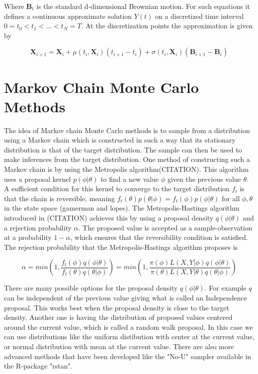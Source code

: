 Where  $\textbf{B}_t$ is the standard d-dimensional Brownian motion. For such equations it defines a continuous approximate solution $Y(t)$ on a discretized time interval $0=t_0 < t_1 < \dots < t_N = T$. At the discretization points the approximation is given by

\begin{equation}
    \textbf{X}_{i+1} = \textbf{X}_i + \mu(t_i, \textbf{X}_i)(t_{i+1} - t_i) + \sigma(t_i, \textbf{X}_i)(\textbf{B}_{i+1} - \textbf{B}_i)
    \label{eq: euler approximation}
\end{equation}






\section{Markov Chain Monte Carlo Methods}
The idea of Markov chain Monte Carlo methods is to sample from a distribution using a Markov chain which is constructed in such a way that its stationary distribution is that of the target distribution. The sample can then be used to make inferences from the target distribution. One method of constructing such a Markov chain is by using the Metropolis algorithm(CITATION). This algorithm uses a proposal kernel $p(\phi | \theta)$ to find a new value $\phi$ given the previous value $\theta$. A sufficient condition for this kernel to converge to the target distribution $f_t$ is that the chain is reversible, meaning $f_t(\theta) p(\theta|\phi) = f_t(\phi) p(\phi|\theta)$ for all $\phi,\theta$ in the state space (gamerman and lopes). The Metropolis-Hastings algorithm introduced in (CITATION) achieves this by using a proposal density $q(\phi|\theta)$ and a rejection probability $\alpha$. The proposed value is accepted as a sample-observation at a probability $1-\alpha$, which ensures that the reversibility condition is satisfied. The rejection probability that the Metropolis-Hastings algorithm proposes is

$$
    \alpha = min \left( 1, \frac{f_t(\phi)q(\phi|\theta)}{f_t(\theta)q(\theta|\phi)} \right) = min \left( 1, \frac{\pi(\phi)L(X,Y|\phi)q(\phi|\theta)}{\pi(\theta)L(X,Y|\theta)q(\theta|\phi)} \right)
$$

There are many possible options for the proposal density $q(\phi|\theta)$. For example $q$ can be independent of the previous value giving what is called an Independence proposal. This works best when the proposal density is close to the target density. Another one is having the distribution of proposed values centered around the current value, which is called a random walk proposal. In this case we can use distributions like the uniform distibution with center at the current value, or normal distribution with mean at the current value. There are also more advanced methods that have been developed like the "No-U" sampler available in the R-package "rstan".


